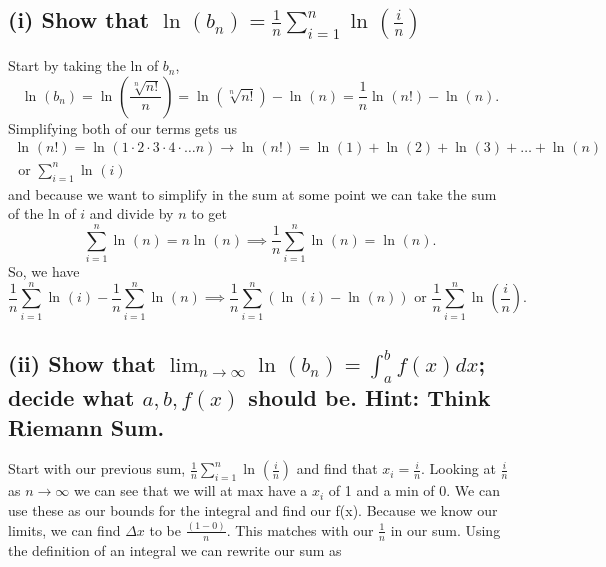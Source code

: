 \subsection*{(i) Show that $ \ln^{  } \left( b_n \right) =\frac{ 1 }{ n } \sum_{ i=1 } ^{ n } \ln^{  } \left( \frac{ i }{ n }  \right)$}%
Start by taking the ln of $ b_n $,
\[
\ln^{  } \left( b_n \right) = \ln^{  } \left( \frac{ \sqrt[ n ]{ n! }  }{ n }  \right) = \ln^{  } \left( \sqrt[ n ]{ n! }  \right) - \ln^{  } \left( n \right) = \frac{ 1 }{ n } \ln^{  } \left( n! \right) -\ln^{  } \left( n \right) 
.\] 
Simplifying both of our terms gets us
\begin{gather*}
\ln^{  } \left( n! \right) = \ln^{  } \left( 1\cdot 2\cdot 3\cdot 4\cdot \ldots n \right) \to \ln^{  } \left( n! \right) = \ln^{  } \left( 1 \right) + \ln^{  } \left( 2 \right) + \ln^{  } \left( 3 \right) + \ldots + \ln^{  } \left( n \right) \\ 
\text{ or } \sum_{ i=1 } ^{ n } \ln^{  } \left( i \right)
\end{gather*}
and because we want to simplify in the sum at some point we can take the sum of the ln of $ i $ and divide by $ n $ to get
\[
\sum_{ i=1 } ^{ n }\ln^{  } \left( n \right) =n\ln^{  } \left( n \right) \implies \frac{ 1 }{ n } \sum_{ i=1 } ^{ n } \ln^{  } \left( n \right) =\ln^{  } \left( n \right)  
.\] 
So, we have
\[
\frac{ 1 }{ n } \sum_{ i=1 } ^{ n } \ln^{  } \left( i \right) - \frac{ 1 }{ n } \sum_{ i=1 } ^{ n } \ln^{  } \left( n \right) \implies \frac{ 1 }{ n } \sum_{ i=1 } ^{ n } \left( \ln^{  } \left( i \right) -\ln^{  } \left( n \right)  \right) \text{ or } \frac{ 1 }{ n } \sum_{ i=1 } ^{ n } \ln^{  } \left( \frac{ i }{ n }  \right) 
.\] 
\newpage
\subsection*{(ii) Show that $ \lim_{ n \to \infty} \ln^{  } \left( b_n \right) =\int_{ a }^{ b } f\left( x \right) dx$; decide what $ a,b,f\left( x \right)  $ should be. Hint: Think Riemann Sum.}%
Start with our previous sum, $  \frac{ 1 }{ n } \sum_{ i=1 } ^{ n } \ln^{  } \left( \frac{ i }{ n }  \right) $ and find that $ x_i =\frac{ i }{ n }  $. Looking at $ \frac{ i }{ n }  $ as $ n \to \infty $ we can see that we will at max have a $ x_i $ of 1 and a min of 0. We can use these as our bounds for the integral and find our f(x). Because we know our limits, we can find $ \Delta x $ to be $ \frac{ \left( 1-0 \right)  }{ n } $. This matches with our $ \frac{ 1 }{ n } $ in our sum. Using the definition of an integral we can rewrite our sum as

